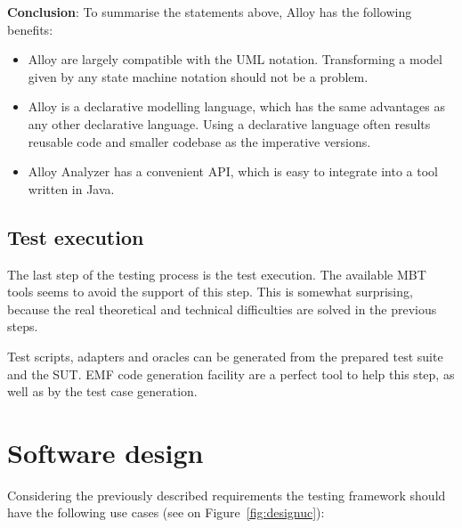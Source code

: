 \textbf{Conclusion}: To summarise the statements above, Alloy has the following benefits:

\begin{itemize}
	\item Alloy are largely compatible with the UML notation. Transforming a model given by any state machine notation should not be a problem.
	\item Alloy is a declarative modelling language, which has the same advantages as any other declarative language. Using a declarative language often results reusable code and smaller codebase as the imperative versions.
	\item Alloy Analyzer has a convenient API, which is easy to integrate into a tool written in Java.
\end{itemize}



\subsection{Test execution}
\label{sub:designtestgeneration}

The last step of the testing process is the test execution. The available MBT tools seems to avoid the support of this step. This is somewhat surprising, because the real theoretical and technical difficulties are solved in the previous steps.

Test scripts, adapters and oracles can be generated from the prepared test suite and the SUT. EMF code generation facility are a perfect tool to help this step, as well as by the test case generation.



\section{Software design}
\label{sec:softwaredesign}

Considering the previously described requirements the testing framework should have the following use cases (see on Figure~\ref{fig:designuc}):

